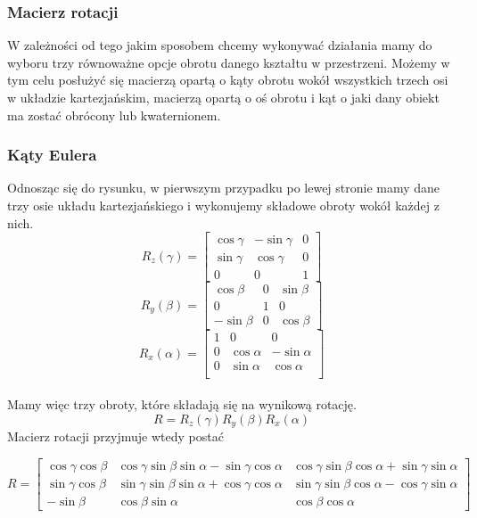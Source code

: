 \documentclass[12pt]{article}
\begin{document}
\subsubsection*{Macierz rotacji}
W zależności od tego jakim sposobem chcemy wykonywać działania mamy do wyboru trzy równoważne opcje obrotu danego kształtu w przestrzeni. Możemy w tym celu posłużyć się macierzą opartą o kąty obrotu wokół wszystkich trzech osi w układzie kartezjańskim, macierzą opartą o oś obrotu i kąt o jaki dany obiekt ma zostać obrócony lub kwaternionem.

\subsubsection*{Kąty Eulera}
Odnosząc się do rysunku, w pierwszym przypadku po lewej stronie mamy dane trzy osie układu kartezjańskiego i wykonujemy składowe obroty wokół każdej z nich. 
\[
R_{z}(\gamma) = \begin{bmatrix}
\cos \gamma & -\sin \gamma & 0 \\
\sin \gamma & \cos \gamma & 0 \\
0 & 0 & 1
\end{bmatrix}
\]
\[
R_{y}(\beta) = \begin{bmatrix}
\cos \beta & 0 & \sin \beta \\
0 & 1 & 0 \\
-\sin \beta & 0 & \cos \beta
\end{bmatrix}
\]
\[
R_{x}(\alpha) = \begin{bmatrix}
1 & 0 & 0 \\
0 & \cos \alpha & -\sin \alpha \\
0 & \sin \alpha & \cos \alpha \\
\end{bmatrix}
\]
\\
Mamy więc trzy obroty, które składają się na wynikową rotację.
\\
\[R = R_{z}(\gamma)R_{y}(\beta)R_{x}(\alpha)\]
Macierz rotacji przyjmuje wtedy postać

\[
R = \begin{bmatrix}
\cos \gamma \cos \beta & 
\cos \gamma \sin \beta \sin \alpha - \sin \gamma \cos \alpha &
\cos \gamma \sin \beta \cos \alpha + \sin \gamma \sin \alpha \\
\sin \gamma \cos \beta &
\sin \gamma \sin \beta \sin \alpha + \cos \gamma \cos \alpha &
\sin \gamma \sin \beta \cos \alpha - \cos \gamma \sin \alpha \\
-\sin \beta & \cos \beta \sin \alpha & \cos \beta \cos \alpha
\end{bmatrix}
\]
\end{document}
